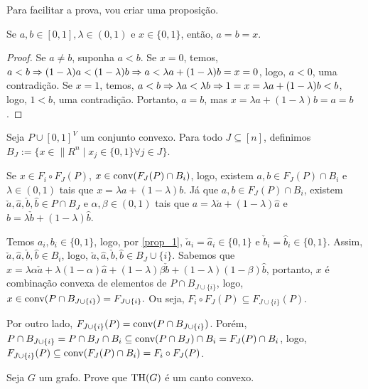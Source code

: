 \begin{homeworkProblemAnswer}
Para facilitar a prova, vou criar uma proposição.
\begin{prop} \label{prop_1}
Se $a,b \in [0,1], \lambda \in (0,1)$ e $x \in \{0,1\}$, então, $a = b = x$.
\end{prop}

\begin{proof}
Se $a \neq b$, suponha $a < b$. Se $x = 0$, temos, $a < b \Rightarrow (1-\lambda)a < (1-\lambda)b \Rightarrow a < \lambda a + (1 - \lambda)b = x = 0$, logo, $a < 0$, uma contradição. Se $x = 1$, temos, $a < b \Rightarrow \lambda a < \lambda b \Rightarrow 1 = x = \lambda a + (1-\lambda) b < b$, logo, $1 < b$, uma contradição. Portanto, $a = b$, mas $x = \lambda a + (1 - \lambda)b = a = b$.
\end{proof}

Seja $P \cup [0,1]^V$ um conjunto convexo. Para todo $J \subseteq [n]$, definimos $B_J := \{x \in \|{R}^n \mid x_j \in \{0,1\} \forall j \in J\}$.

Se $x \in F_i \circ F_J(P)$, $x \in \textrm{conv}(F_J(P) \cap B_i)$, logo, existem $a,b \in F_J(P) \cap B_i$ e $\lambda \in (0,1)$ tais que $x = \lambda a + (1 - \lambda) b$. Já que $a,b \in F_J(P) \cap B_i$, existem $\check{a}, \hat{a}, \check{b}, \hat{b} \in P \cap B_J$ e $\alpha, \beta \in (0,1)$ tais que $a = \lambda \check{a} + (1 - \lambda) \hat{a}$ e $b = \lambda \check{b} + (1 - \lambda) \hat{b}$.  

Temos $a_i, b_i \in \{0,1\}$, logo, por \ref{prop_1}, $\check{a}_i = \hat{a}_i \in \{0,1\}$ e $\check{b}_i = \hat{b}_i \in \{0,1\}$. Assim, $\check{a}, \hat{a}, \check{b}, \hat{b} \in B_i$, logo, $\check{a}, \hat{a}, \check{b}, \hat{b} \in B_J \cup \{i\}$. Sabemos que $x = \lambda \alpha \check{a} + \lambda (1-\alpha) \hat{a} + (1-\lambda) \beta \check{b} + (1-\lambda) (1-\beta) \hat{b}$, portanto, $x$ é combinação convexa de elementos de $P \cap B_{J\cup\{i\}}$, logo, $x \in \textrm{conv}(P\cap B_{J\cup\{i\}}) = F_{J\cup\{i\}}.$ Ou seja, $F_i \circ F_J(P) \subseteq F_{J\cup\{i\}}(P)$.  

Por outro lado, $F_{J\cup\{i\}}(P) = \textrm{conv}(P\cap B_{J\cup\{i\}})$. Porém, $P \cap B_{J\cup\{i\}} = P \cap B_J \cap B_i \subseteq \textrm{conv}(P\cap B_J)\cap B_i = F_J(P)\cap B_i$, logo, $F_{J \cup \{i\}}(P) \subseteq \textrm{conv}(F_J(P)\cap B_i) = F_i \circ F_J(P)$.
\end{homeworkProblemAnswer}

\begin{homeworkProblem}
Seja $G$ um grafo. Prove que $\textrm{TH}(G)$ é um canto convexo.
\end{homeworkProblem}


